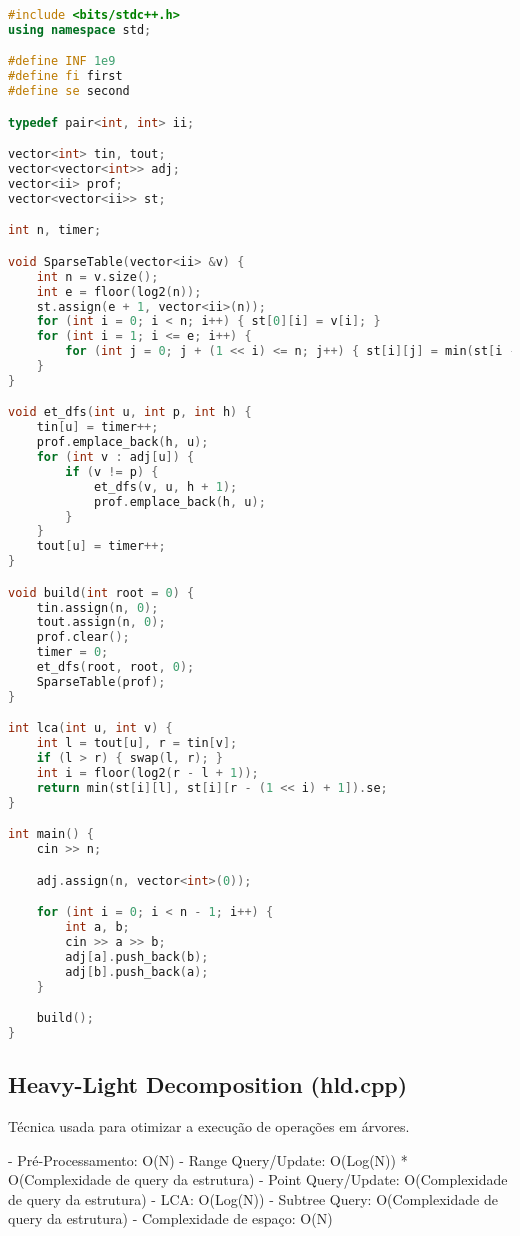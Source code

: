 \documentclass[11pt, a4paper, twoside]{article}
\begin{document}
\begin{lstlisting}[language=C++]
#include <bits/stdc++.h>
using namespace std;

#define INF 1e9
#define fi first
#define se second

typedef pair<int, int> ii;

vector<int> tin, tout;
vector<vector<int>> adj;
vector<ii> prof;
vector<vector<ii>> st;

int n, timer;

void SparseTable(vector<ii> &v) {
    int n = v.size();
    int e = floor(log2(n));
    st.assign(e + 1, vector<ii>(n));
    for (int i = 0; i < n; i++) { st[0][i] = v[i]; }
    for (int i = 1; i <= e; i++) {
        for (int j = 0; j + (1 << i) <= n; j++) { st[i][j] = min(st[i - 1][j], st[i - 1][j + (1 << (i - 1))]); }
    }
}

void et_dfs(int u, int p, int h) {
    tin[u] = timer++;
    prof.emplace_back(h, u);
    for (int v : adj[u]) {
        if (v != p) {
            et_dfs(v, u, h + 1);
            prof.emplace_back(h, u);
        }
    }
    tout[u] = timer++;
}

void build(int root = 0) {
    tin.assign(n, 0);
    tout.assign(n, 0);
    prof.clear();
    timer = 0;
    et_dfs(root, root, 0);
    SparseTable(prof);
}

int lca(int u, int v) {
    int l = tout[u], r = tin[v];
    if (l > r) { swap(l, r); }
    int i = floor(log2(r - l + 1));
    return min(st[i][l], st[i][r - (1 << i) + 1]).se;
}

int main() {
    cin >> n;

    adj.assign(n, vector<int>(0));

    for (int i = 0; i < n - 1; i++) {
        int a, b;
        cin >> a >> b;
        adj[a].push_back(b);
        adj[b].push_back(a);
    }

    build();
}
\end{lstlisting}

\subsection{Heavy-Light Decomposition (hld.cpp)}


Técnica usada para otimizar a execução de operações em árvores.

- Pré-Processamento: O(N)
- Range Query/Update: O(Log(N)) * O(Complexidade de query da estrutura)
- Point Query/Update: O(Complexidade de query da estrutura)
- LCA: O(Log(N))
- Subtree Query: O(Complexidade de query da estrutura)
- Complexidade de espaço: O(N)
\end{document}
